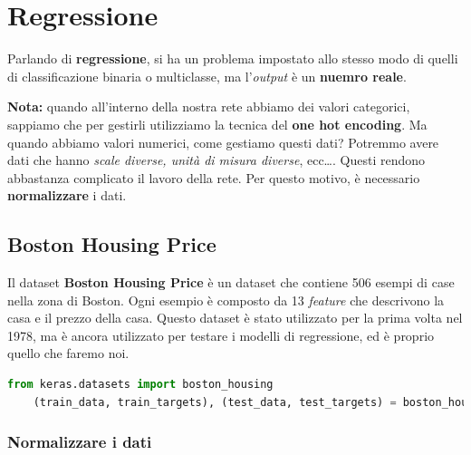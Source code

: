 \section{Regressione}
\label{sec:regressione}

Parlando di \textbf{regressione}, si ha un problema impostato allo stesso modo
di quelli di classificazione binaria o multiclasse, ma l'\textit{output} è un
\textbf{nuemro reale}.

\textbf{Nota:} quando all'interno della nostra rete abbiamo dei valori categorici, sappiamo che per
gestirli utilizziamo la tecnica del \textbf{one hot encoding}. Ma quando abbiamo valori numerici, come gestiamo questi dati?
Potremmo avere dati che hanno \textit{scale diverse, unità di misura diverse}, ecc\dots. Questi rendono abbastanza
complicato il lavoro della rete. Per questo motivo, è necessario \textbf{normalizzare} i dati.

\subsection{Boston Housing Price}
\label{subsec:boston_housing_price}

Il dataset \textbf{Boston Housing Price} è un dataset che contiene 506 esempi
di case nella zona di Boston. Ogni esempio è composto da 13 \textit{feature}
che descrivono la casa e il prezzo della casa. Questo dataset è stato
utilizzato per la prima volta nel 1978, ma è ancora utilizzato per testare i
modelli di regressione, ed è proprio quello che faremo noi.

\begin{lstlisting}[language=Python, caption=Caricamento del dataset]
    from keras.datasets import boston_housing
    (train_data, train_targets), (test_data, test_targets) = boston_housing.load_data()
\end{lstlisting}

\subsubsection{Normalizzare i dati}
\label{subsubsec:normalizzare_dati}

